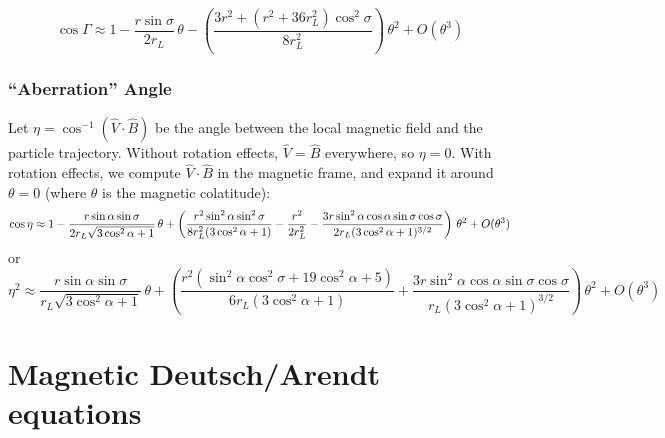 \documentclass{article}
\begin{document}
\begin{equation}
    \cos\Gamma \approx 1 - \frac{r\sin\sigma}{2r_L}\,\theta - \left(\frac{3r^2 + (r^2 + 36r_L^2)\cos^2\sigma}{8r_L^2}\right)\,\theta^2 + O(\theta^3)
\end{equation}

\subsubsection{``Aberration'' Angle}

Let $\eta = \cos^{-1}(\hat{V}\cdot\hat{B})$ be the angle between the local magnetic field and the particle trajectory.
Without rotation effects, $\hat{V} = \hat{B}$ everywhere, so $\eta = 0$.
With rotation effects, we compute $\hat{V}\cdot\hat{B}$ in the magnetic frame, and expand it around $\theta = 0$ (where $\theta$ is the magnetic colatitude):
\begin{equation}
    \cos\eta \approx 1 - \frac{r\sin\alpha\sin\sigma}{2r_L\sqrt{3\cos^2\alpha+1}}\,\theta +
        \left(\frac{r^2\sin^2\alpha\sin^2\sigma}{8r_L^2(3\cos^2\alpha+1)} -
              \frac{r^2}{2r_L^2} -
              \frac{3r\sin^2\alpha\cos\alpha\sin\sigma\cos\sigma}{2r_L(3\cos^2\alpha+1)^{3/2}}\right)\,\theta^2 + O(\theta^3) \\
\end{equation}
or
\begin{equation}
    \eta^2 \approx \frac{r\sin\alpha\sin\sigma}{r_L\sqrt{3\cos^2\alpha+1}}\,\theta +
        \left(\frac{r^2(\sin^2\alpha\cos^2\sigma + 19\cos^2\alpha + 5)}{6r_L(3\cos^2\alpha + 1)} +
              \frac{3r\sin^2\alpha\cos\alpha\sin\sigma\cos\sigma}{r_L(3\cos^2\alpha+1)^{3/2}}\right)\,\theta^2 + O(\theta^3)
\end{equation}

\section{Magnetic Deutsch/Arendt equations}
\end{document}
